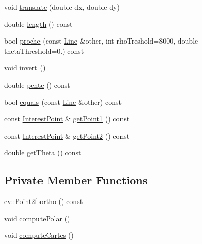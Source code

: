 \begin{DoxyCompactItemize}
\item 
void \hyperlink{classdefals_1_1_line_afd9940c88b4d83aeaa9313d71fc93fdd}{translate} (double dx, double dy)
\item 
double \hyperlink{classdefals_1_1_line_a908b142ba4a17102326274ffcd83d3b4}{length} () const
\item 
bool \hyperlink{classdefals_1_1_line_a99488154d6dc7781097fdd1e71546395}{proche} (const \hyperlink{classdefals_1_1_line}{Line} \&other, int rho\+Treshold=8000, double theta\+Threshold=0.) const
\item 
void \hyperlink{classdefals_1_1_line_ae479c8d219ad3eb6088f17fb1b7178ef}{invert} ()
\item 
double \hyperlink{classdefals_1_1_line_ab8aafcf0f1dc98dcd8193a92c169500b}{pente} () const
\item 
bool \hyperlink{classdefals_1_1_line_a55c7e9badee5057b3d001429a0d62aab}{equals} (const \hyperlink{classdefals_1_1_line}{Line} \&other) const
\item 
const \hyperlink{classdefals_1_1_interest_point}{Interest\+Point} \& \hyperlink{classdefals_1_1_line_a0dea2160453de4dbda56426cc3305f93}{get\+Point1} () const
\item 
const \hyperlink{classdefals_1_1_interest_point}{Interest\+Point} \& \hyperlink{classdefals_1_1_line_a21ad33e8b62513d0b9ca68a345f61f5a}{get\+Point2} () const
\item 
double \hyperlink{classdefals_1_1_line_a537fefe10a592ef543888a91b6a6d118}{get\+Theta} () const
\end{DoxyCompactItemize}
\subsection*{Private Member Functions}
\begin{DoxyCompactItemize}
\item 
cv\+::\+Point2f \hyperlink{classdefals_1_1_line_a90312d4ec4bb1b1ea65c7f8abe6383f3}{ortho} () const
\item 
void \hyperlink{classdefals_1_1_line_a82e84373baddc704f337618952c54ccb}{compute\+Polar} ()
\item 
void \hyperlink{classdefals_1_1_line_a9b82bc15d9464d7b33c1ec417a5f707d}{compute\+Cartes} ()
\end{DoxyCompactItemize}
